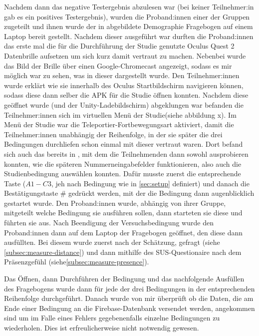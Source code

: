         Nachdem dann das negative Testergebnis abzulesen war (bei keiner Teilnehmer:in gab es ein positives Testergebnis), wurden die Proband:innen einer der Gruppen zugeteilt %
        und ihnen wurde der in %
        abgebildete Demographie Fragebogen auf einem Laptop bereit gestellt. Nachdem dieser ausgeführt war durften die Proband:innen das erste mal die für die Durchführung der Studie genutzte Oculus Quest 2 Datenbrille aufsetzen um sich kurz damit vertraut zu machen. Nebenbei wurde das Bild der Brille über einen Google-Chromecast angezeigt, sodass es mir %
        möglich war zu sehen, was in dieser dargestellt wurde. Den Teilnehmer:innen wurde erklärt wie sie innerhalb des Oculus Startbildschirm navigieren können, sodass diese dann selber die APK für die Studie öffnen konnten.
        Nachdem diese geöffnet wurde (und der Unity-Ladebildschirm) abgeklungen war befanden die Teilnehmer:innen sich im virtuellen Menü der Studie(siehe abbildung x). Im Menü der Studie war die Teleportier-Fortbewegungsart aktiviert, damit die Teilnehmer:innen unabhängig der Reihenfolge, in der sie später die drei Bedingungen durchliefen schon einmal mit dieser vertraut waren.
        Dort befand sich auch das bereits in %
        , mit dem die Teilnehmenden dann sowohl ausprobieren konnten, wie die späteren Nummerneingabefelder funktionieren, also auch die Studienbedingung auswählen konnten. Dafür musste zuerst die entsprechende Taste ($A1-C3$, jeh nach Bedingung wie in \autoref{sec:setup} definiert) und danach die Bestätigungstaste \# gedrückt werden, mit der die Bedingung dann augenblicklich gestartet wurde. Den Proband:innen wurde, abhängig von ihrer Gruppe, mitgeteilt welche Bedingung sie ausführen sollen, dann starteten sie diese und führten sie aus.
        Nach Beendigung der Versuchsbedingung wurde den Proband:innen dann auf dem Laptop der Fragebogen %
        geöffnet, den diese dann ausfüllten. Bei diesem wurde zuerst nach der Schätzung, gefragt (siehe \autoref{subsec:measure-distance}) und dann mithilfe des SUS-Questionaire %
        nach dem Präsenzgefühl (siehe\autoref{subsec:measure-presence}).

        Das Öffnen, dann Durchführen der Bedingung und das nachfolgende Ausfüllen des Fragebogens %
        wurde dann für jede der drei Bedingungen in der entsprechenden Reihenfolge durchgeführt. Danach wurde von mir überprüft ob die Daten, die am Ende einer Bedingung an die Firebase-Datenbank versendet werden, angekommen sind um im Falle eines Fehlers gegebenenfalls einzelne Bedingungen zu wiederholen. Dies ist erfreulicherweise nicht notwendig gewesen.

